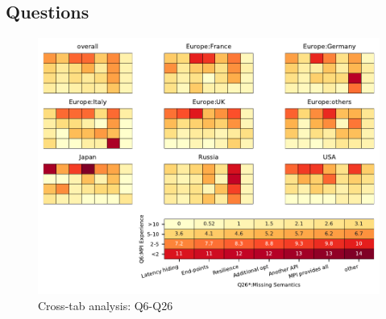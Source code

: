 
\subsection{Questions}


\begin{figure}
\begin{center}
\includegraphics[width=12cm]{../pdfs/Q6-Q26.pdf}
\caption{Cross-tab analysis: Q6-Q26}
\label{fig:Q6-Q26}
\end{center}
\end{figure}
